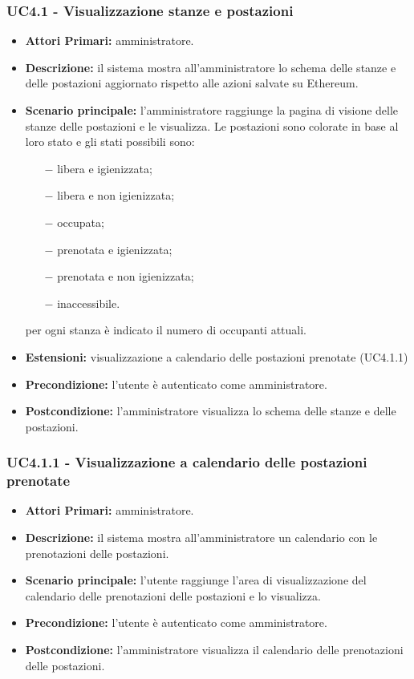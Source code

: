 \subsubsection{ UC4.1 - Visualizzazione stanze e postazioni}
\begin{itemize}
	\item\textbf{Attori Primari:}
	amministratore.
	\item\textbf{Descrizione:}
	il sistema mostra all'amministratore lo schema delle stanze e delle postazioni aggiornato rispetto alle azioni salvate su Ethereum.
	\item\textbf{Scenario principale:}
	l'amministratore raggiunge la pagina di visione delle stanze delle postazioni e le visualizza. Le postazioni sono colorate in base al loro stato e gli stati possibili sono:
	\begin{itemize}
		\item[$-$] libera e igienizzata;
		\item[$-$] libera e non igienizzata;
		\item[$-$] occupata;
		\item[$-$] prenotata e igienizzata;
		\item[$-$] prenotata e non igienizzata;
		\item[$-$] inaccessibile.
	\end{itemize}
	per ogni stanza è indicato il numero di occupanti attuali.
	\item\textbf{Estensioni:}
	visualizzazione a calendario delle postazioni prenotate (UC4.1.1)
	\item\textbf{Precondizione:} 
	l'utente è autenticato come amministratore.
	\item\textbf{Postcondizione:}
	l'amministratore visualizza lo schema delle stanze e delle postazioni.
\end{itemize}

\subsubsection{ UC4.1.1 - Visualizzazione a calendario delle postazioni prenotate}
\begin{itemize}
	\item\textbf{Attori Primari:}
	amministratore.
	\item\textbf{Descrizione:}
	il sistema mostra all'amministratore un calendario con le prenotazioni delle postazioni.
	\item\textbf{Scenario principale:}
	l'utente raggiunge l'area di visualizzazione del calendario delle prenotazioni delle postazioni e lo visualizza.
	\item\textbf{Precondizione:} 
	l'utente è autenticato come amministratore.
	\item\textbf{Postcondizione:}
	l'amministratore visualizza il calendario delle prenotazioni delle postazioni.
\end{itemize}

